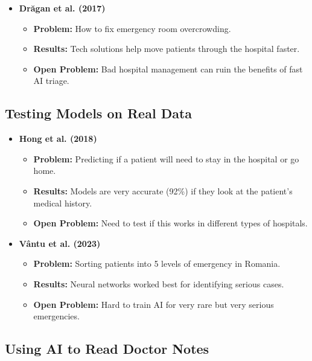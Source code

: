\documentclass{article}
\begin{document}
\begin{itemize}
    \item \textbf{Drăgan et al. (2017) \cite{Dragan}}
    \begin{itemize}
        \item \textbf{Problem:} How to fix emergency room overcrowding.
        \item \textbf{Results:} Tech solutions help move patients through the hospital faster.
        \item \textbf{Open Problem:} Bad hospital management can ruin the benefits of fast AI triage.
    \end{itemize}
\end{itemize}

\subsection{Testing Models on Real Data}

\begin{itemize}
    \item \textbf{Hong et al. (2018) \cite{Hong2018PredictingHA}}
    \begin{itemize}
        \item \textbf{Problem:} Predicting if a patient will need to stay in the hospital or go home.
        \item \textbf{Results:} Models are very accurate (92\%) if they look at the patient's medical history.
        \item \textbf{Open Problem:} Need to test if this works in different types of hospitals.
    \end{itemize}

    \item \textbf{Vântu et al. (2023) \cite{Vantu2023}}
    \begin{itemize}
        \item \textbf{Problem:} Sorting patients into 5 levels of emergency in Romania.
        \item \textbf{Results:} Neural networks worked best for identifying serious cases.
        \item \textbf{Open Problem:} Hard to train AI for very rare but very serious emergencies.
    \end{itemize}
\end{itemize}

\subsection{Using AI to Read Doctor Notes}
\end{document}
